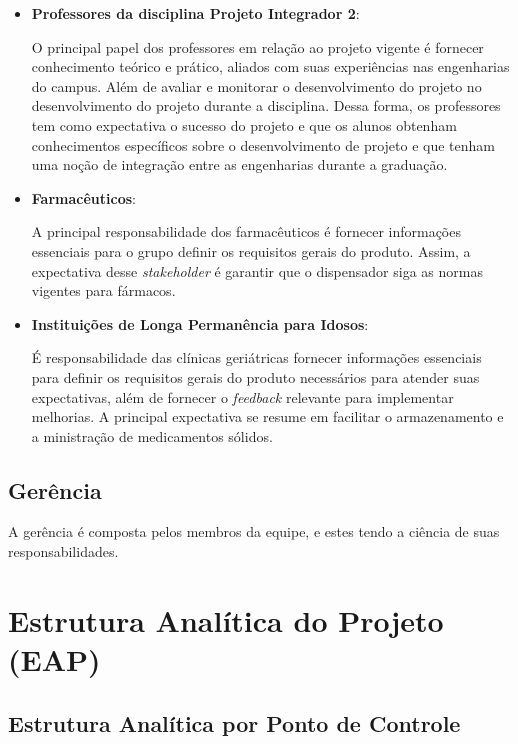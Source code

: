 \begin{apendicesenv}
\begin{itemize}
\item \textbf{Professores da disciplina Projeto Integrador 2}:

O principal papel dos professores em relação ao projeto vigente é fornecer conhecimento teórico e prático, aliados com suas experiências nas engenharias do campus. Além de avaliar e monitorar o desenvolvimento do projeto no desenvolvimento do projeto durante a disciplina. Dessa forma, os professores tem como expectativa o sucesso do projeto e que os alunos obtenham conhecimentos específicos sobre o desenvolvimento de projeto e que tenham uma noção de integração entre as engenharias durante a graduação.
\item \textbf{Farmacêuticos}:

A principal responsabilidade dos farmacêuticos é fornecer informações essenciais para o grupo definir os requisitos gerais do produto. Assim, a expectativa desse \textit{stakeholder} é garantir que o dispensador siga as normas vigentes para fármacos.

\item \textbf{Instituições de Longa Permanência para Idosos}:

É responsabilidade das clínicas geriátricas fornecer informações essenciais para definir os requisitos gerais do produto necessários para atender suas expectativas, além de fornecer o \textit{feedback} relevante para implementar melhorias.  A principal expectativa se resume em facilitar o armazenamento e a ministração de medicamentos sólidos.
\end{itemize}


\section{Gerência}

A gerência é composta pelos membros da equipe, e estes tendo a ciência de suas responsabilidades.

\chapter{Estrutura Analítica do Projeto (EAP)}
\label{EAP_app}
\section{Estrutura Analítica por Ponto de Controle}


\end{apendicesenv}
